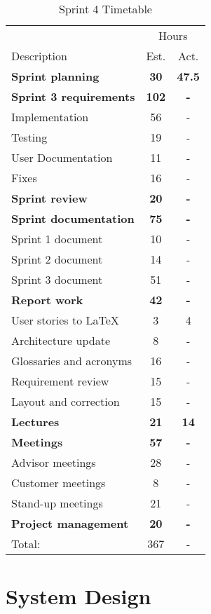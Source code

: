 \begin{table}[!htb] \small \center
\caption{Sprint 4 Timetable\label{tab:sprint4time}}
\begin{tabularx}{\textwidth}{X c c}
	\toprule
	& \multicolumn{2}{c}{Hours} \\
	\cmidrule(r){2-3}
	Description & Est. & Act. \\
	\midrule
	\textbf{Sprint planning} & \textbf{30} & \textbf{47.5} \\
	\addlinespace
	\textbf{Sprint 3 requirements} & \textbf{102} & \textbf{-} \\
	Implementation & 56 & - \\
	Testing & 19 & - \\
	User Documentation & 11 & - \\
	Fixes & 16 & - \\
	\addlinespace
	\textbf{Sprint review} & \textbf{20} & \textbf{-} \\
	\addlinespace
	\textbf{Sprint documentation} & \textbf{75} & \textbf{-} \\
	Sprint 1 document & 10 & -\\
	Sprint 2 document & 14 & - \\
	Sprint 3 document & 51 & - \\
	\addlinespace
	\textbf{Report work} & \textbf{42} & \textbf{-} \\
	User stories to LaTeX & 3 & 4\\
	Architecture update & 8 & -\\
	Glossaries and acronyms & 16 & -\\
	Requirement review & 15 & -\\
	Layout and correction & 15 & -\\
	\addlinespace
	\textbf{Lectures} & \textbf{21} & \textbf{14} \\
	\addlinespace
	\textbf{Meetings} & \textbf{57} & \textbf{-} \\
	Advisor meetings & 28 & - \\
	Customer meetings & 8 & - \\
	Stand-up meetings & 21 & - \\
	\textbf{Project management} & \textbf{20} & \textbf{-} \\
	\midrule
	Total: & 367 & - \\
	\bottomrule
\end{tabularx}
\end{table}



\section{System Design}


